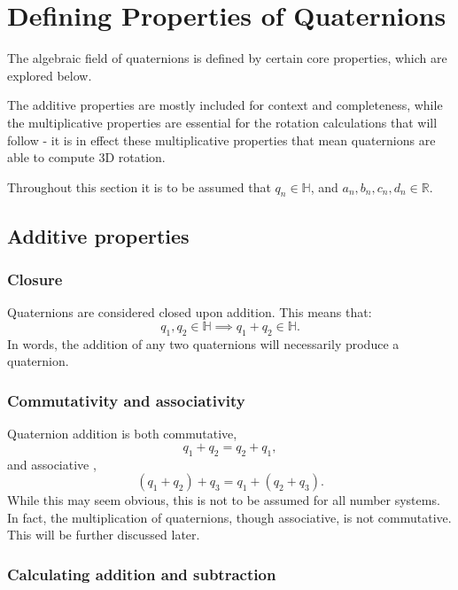 \documentclass[10pt]{article}
\begin{document}
\section{Defining Properties of Quaternions}

The algebraic field of quaternions is defined by certain core properties, which are explored below.

The additive properties are mostly included for context and completeness, while the multiplicative properties are essential for the rotation calculations that will follow - it is in effect these multiplicative properties that mean quaternions are able to compute 3D rotation.

Throughout this section it is to be assumed that $q_n \in \mathbb{H}$, and $a_n, b_n, c_n, d_n \in \mathbb{R}$.

\subsection{Additive properties}

\subsubsection{Closure}

Quaternions are considered closed upon addition. This means that:
\begin{equation}
    q_1, q_2 \in \mathbb{H} \implies q_1 + q_2 \in \mathbb{H}.
\end{equation}
In words, the addition of any two quaternions will necessarily produce a quaternion. \cite{Illinois}

\subsubsection{Commutativity and associativity}

Quaternion addition is both commutative,
\begin{equation}
    q_1 + q_2 = q_2 + q_1,
\end{equation}
and associative \cite{Illinois},
\begin{equation}
    (q_1 + q_2) + q_3 = q_1 + (q_2 + q_3).
\end{equation}
While this may seem obvious, this is not to be assumed for all number systems. In fact, the multiplication of quaternions, though associative, is not commutative. This will be further discussed later.

\subsubsection{Calculating addition and subtraction}
\end{document}
